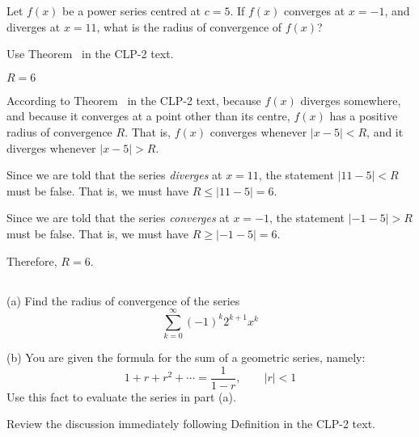 \begin{Mquestion}
	Let $f(x)$ be a power series centred at $c=5$. If $f(x)$ converges at $x=-1$, and diverges at $x=11$, what is the radius of convergence of $f(x)$?
\end{Mquestion}
\begin{hint}
	Use Theorem~ in the CLP-2 text.
\end{hint}
\begin{answer}
	$R=6$
\end{answer}
\begin{solution}
	According to Theorem~ in the CLP-2 text, because $f(x)$ diverges somewhere, and because it converges at a point other than its centre,  $f(x)$ has a positive radius of convergence $R$. That is, $f(x)$ converges whenever $|x-5|<R$, and it diverges whenever $|x-5|>R$.

	Since we are told that the series \emph{diverges} at $x=11$, the statement $|11-5|<R$ must be false. That is, we must have $R\le |11-5|=6$.

	Since we are told that the series \emph{converges} at $x=-1$, the statement $|-1-5|>R$ must be false. That is, we must have $R\ge |-1-5|=6$.
	
	Therefore, $R=6$.
\end{solution}









\subsection*{\Procedural}

\begin{Mquestion}[M105 2012A]
(a) Find the radius of convergence of the series
\begin{equation*}
\sum_{k=0}^\infty (-1)^k 2^{k+1} x^k
\end{equation*}

\noindent (b)
You are given the formula for the sum of a geometric series, namely:
\begin{equation*}
1+r+r^2 + \cdots =\frac{1}{1-r},\qquad|r|<1
\end{equation*}
Use this fact to evaluate the series in part (a).
\end{Mquestion}

\begin{hint}
Review the discussion immediately following Definition
 in the
CLP-2 text.
\end{hint}

